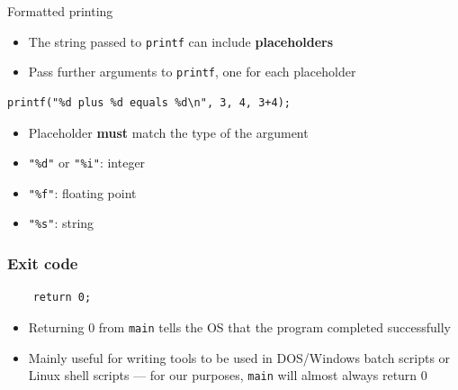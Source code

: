 \begin{frame}[fragile]{Formatted printing}
	\pause
	\begin{itemize}
		\item The string passed to \lstinline{printf} can include \textbf{placeholders} \pause
		\item Pass further arguments to \lstinline{printf}, one for each placeholder \pause
	\end{itemize}
	\begin{lstlisting}
printf("%d plus %d equals %d\n", 3, 4, 3+4);
	\end{lstlisting}
	\begin{itemize}
		\item Placeholder \textbf{must} match the type of the argument \pause
		\item \lstinline{"%d"} or \lstinline{"%i"}: integer \pause
		\item \lstinline{"%f"}: floating point \pause
		\item \lstinline{"%s"}: string
	\end{itemize}
\end{frame}

\begin{frame}[fragile]
	\frametitle{Exit code}
	\begin{lstlisting}
    return 0;
	\end{lstlisting}
	\pause
	\begin{itemize}
		\item Returning 0 from \lstinline{main} tells the OS that the program completed successfully \pause
		\item Mainly useful for writing tools to be used in DOS/Windows batch scripts or Linux shell scripts ---
			for our purposes, \lstinline{main} will almost always return 0
	\end{itemize}
\end{frame}
